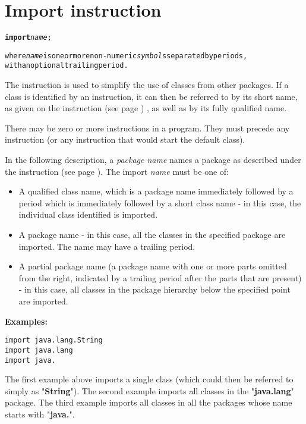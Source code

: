 \section{Import instruction}\label{refimport}
\begin{shaded}
\begin{alltt}
\textbf{import} \emph{name};

where \emph{name} is one or more non-numeric \emph{symbol}s separated by periods,\\ with an optional trailing period.
\end{alltt}
\end{shaded}
 
The  instruction is used to simplify the use of
classes from other packages.
If a class is identified by an  instruction, it can then
be referred to by its short name, as given on the
  instruction (see page \pageref{refclass}) , as well as by its fully
qualified name.
 
There may be zero or more  instructions in a program.
They must precede any  instruction (or any instruction
that would start the default class).
 
In the following description, a \emph{package name} names a package
as described under the   instruction (see page \pageref{refpackage}).
The import \emph{name} must be one of:
\begin{itemize}
\item A qualified class name, which is a package name immediately followed
by a period which is immediately followed by a short class name - in this case, the individual class identified is imported.
\item A package name - in this case, all the classes in the specified
package are imported.  The name may have a trailing period.
\item A partial package name (a package name with one or more parts
omitted from the right, indicated by a trailing period after the parts
that are present) - in this case, all classes in the package hierarchy
below the specified point are imported.
\end{itemize}
 \textbf{Examples:}
\begin{lstlisting}
import java.lang.String
import java.lang
import java.
\end{lstlisting}
The first example above imports a single class (which could then be
referred to simply as "\textbf{String}").
The second example imports all classes in the
"\textbf{java.lang}" package.
The third example imports all classes in all the packages whose name
starts with "\textbf{java.}".
 
